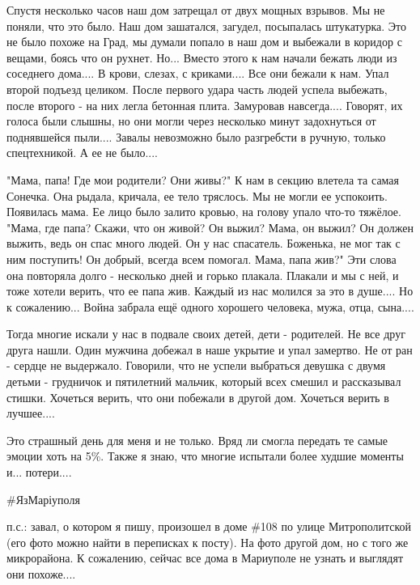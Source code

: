 Спустя несколько часов наш дом затрещал от двух мощных взрывов. Мы не поняли,
что это было. Наш дом зашатался, загудел, посыпалась штукатурка. Это не было
похоже на Град, мы думали попало в наш дом и выбежали в коридор с вещами, боясь
что он рухнет. Но... Вместо этого к нам начали бежать люди из соседнего
дома.... В крови, слезах, с криками.... Все они бежали к нам. Упал второй
подъезд целиком. После первого удара часть людей успела выбежать, после второго
- на них легла бетонная плита. Замуровав навсегда.... Говорят, их голоса были
слышны, но они могли через несколько минут задохнуться от поднявшейся пыли....
Завалы невозможно было разгребсти в ручную, только спецтехникой. А ее не
было....

"Мама, папа! Где мои родители? Они живы?" К нам в секцию влетела та самая
Сонечка. Она рыдала, кричала, ее тело тряслось. Мы не могли ее успокоить.
Появилась мама. Ее лицо было залито кровью, на голову упало что-то тяжёлое.
"Мама, где папа? Скажи, что он живой? Он выжил? Мама, он выжил? Он должен
выжить, ведь он спас много людей. Он у нас спасатель. Боженька, не мог так с
ним поступить! Он добрый, всегда всем помогал. Мама, папа жив?" Эти слова она
повторяла долго - несколько дней и горько плакала. Плакали и мы с ней,  и тоже
хотели верить, что ее папа жив. Каждый из нас молился за это в душе.... Но к
сожалению... Война забрала ещё одного хорошего человека, мужа, отца, сына....

Тогда многие искали у нас в подвале своих детей, дети - родителей. Не все друг
друга нашли. Один мужчина добежал в наше укрытие и упал замертво. Не от ран -
сердце не выдержало. Говорили, что не успели выбраться девушка с двумя детьми -
грудничок и пятилетний мальчик, который всех смешил и рассказывал стишки.
Хочеться верить, что они побежали в другой дом. Хочеться верить в лучшее....

Это страшный день для меня и не только.   Вряд ли смогла передать те самые
эмоции хоть на 5\%. Также я знаю, что многие испытали более худшие моменты и...
потери....

\#ЯзМаріуполя

п.с.: завал, о котором я пишу, произошел в доме \#108 по улице Митрополитской
(его фото можно найти в переписках к посту). На фото другой дом, но с того же
микрорайона. К сожалению, сейчас все дома в Мариуполе не узнать и выглядят они
похоже....
